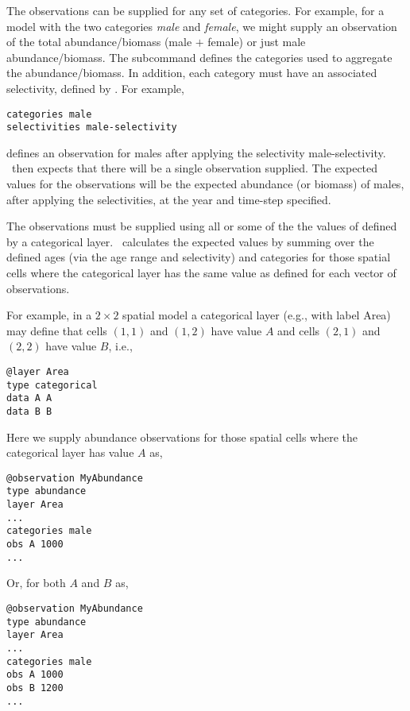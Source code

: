 {{{{{{The observations can be supplied for any set of categories. For example, for a model with the two categories \emph{male} and \emph{female}, we might supply an observation of the total abundance/biomass (male $+$ female) or just male abundance/biomass. The subcommand  defines the categories used to aggregate the abundance/biomass. In addition, each category must have an associated selectivity, defined by . For example,  

{\small{\begin{verbatim}
categories male
selectivities male-selectivity
\end{verbatim}}}

defines an observation for males after applying the selectivity male-selectivity. \SPM\ then expects that there will be a single observation supplied. The expected values for the observations will be the expected abundance (or biomass) of males, after applying the selectivities, at the year and time-step specified. 

The observations must be supplied using all or some of the the values of defined by a categorical layer. \SPM\ calculates the expected values by summing over the defined ages (via the age range and selectivity) and categories for those spatial cells where the categorical layer has the same value as defined for each vector of observations.

For example, in a $2 \times 2$ spatial model a categorical layer (e.g., with label Area) may define that cells $(1,1)$ and $(1,2)$ have value $A$ and cells $(2,1)$ and $(2,2)$ have value $B$, i.e.,

{\small{\begin{verbatim}
@layer Area
type categorical
data A A 
data B B
\end{verbatim}}}

Here we supply abundance observations for those spatial cells where the categorical layer has value $A$ as, 

{\small{\begin{verbatim}
@observation MyAbundance
type abundance
layer Area
...
categories male 
obs A 1000
...
\end{verbatim}}}

Or, for both $A$ and $B$ as,

{\small{\begin{verbatim}
@observation MyAbundance
type abundance
layer Area
...
categories male
obs A 1000
obs B 1200
...
\end{verbatim}}}

}}}}}}
